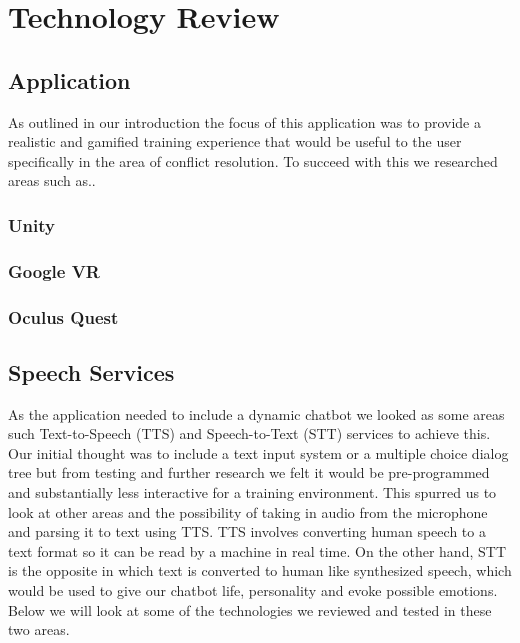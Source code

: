\chapter{Technology Review}

\section{Application}
As outlined in our introduction the focus of this application was to provide a realistic and gamified training experience that would be useful to the user specifically in the area of conflict resolution. To succeed with this we researched areas such as..

\subsection{Unity}
\subsection{Google VR}
\subsection{Oculus Quest}

\section{Speech Services}
As the application needed to include a dynamic chatbot we looked as some areas such Text-to-Speech (TTS) and Speech-to-Text (STT) services to achieve this. Our initial thought was to include a text input system or a multiple choice dialog tree but from testing and further research we felt it would be pre-programmed and substantially less interactive for a training environment. This spurred us to look at other areas and the possibility of taking in audio from the microphone and parsing it to text using TTS. TTS involves converting human speech to a text format so it can be read by a machine in real time. On the other hand, STT is the opposite in which text is converted to human like synthesized speech, which would be used to give our chatbot life, personality and evoke possible emotions. Below we will look at some of the technologies we reviewed and tested in these two areas.


